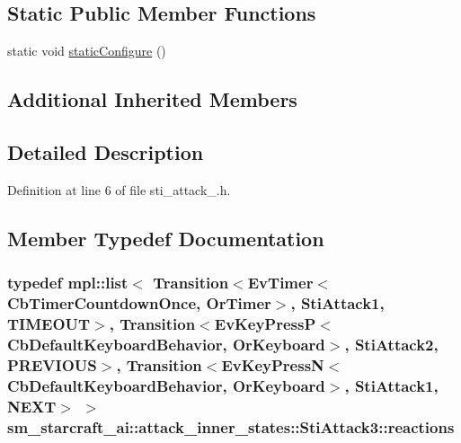 \subsection*{Static Public Member Functions}
\begin{DoxyCompactItemize}
\item 
static void \hyperlink{structsm__starcraft__ai_1_1attack__inner__states_1_1StiAttack3_a95e932b70e9a8de911ab0d6f74b567a5}{static\+Configure} ()
\end{DoxyCompactItemize}
\subsection*{Additional Inherited Members}


\subsection{Detailed Description}


Definition at line 6 of file sti\+\_\+attack\+\_.\+h.



\subsection{Member Typedef Documentation}
\subsubsection[{\texorpdfstring{reactions}{reactions}}]{\setlength{\rightskip}{0pt plus 5cm}typedef mpl\+::list$<$ Transition$<$Ev\+Timer$<$Cb\+Timer\+Countdown\+Once, {\bf Or\+Timer}$>$, {\bf Sti\+Attack1}, {\bf T\+I\+M\+E\+O\+UT}$>$, Transition$<$Ev\+Key\+PressP$<$Cb\+Default\+Keyboard\+Behavior, {\bf Or\+Keyboard}$>$, {\bf Sti\+Attack2}, {\bf P\+R\+E\+V\+I\+O\+US}$>$, Transition$<$Ev\+Key\+PressN$<$Cb\+Default\+Keyboard\+Behavior, {\bf Or\+Keyboard}$>$, {\bf Sti\+Attack1}, {\bf N\+E\+XT}$>$ $>$ {\bf sm\+\_\+starcraft\+\_\+ai\+::attack\+\_\+inner\+\_\+states\+::\+Sti\+Attack3\+::reactions}}\hypertarget{structsm__starcraft__ai_1_1attack__inner__states_1_1StiAttack3_acebef7eb53f0bacb5a6be79fdd61c831}{}\label{structsm__starcraft__ai_1_1attack__inner__states_1_1StiAttack3_acebef7eb53f0bacb5a6be79fdd61c831}



